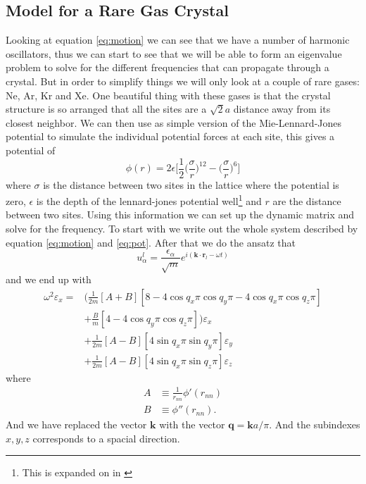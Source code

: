 \documentclass[11pt]{article}
\begin{document}
\subsection{Model for a Rare Gas Crystal}
Looking at equation \ref{eq:motion} we can see that we have a number of harmonic oscillators, thus we can start to see that we will be able to form an eigenvalue problem to solve for the different frequencies that can propagate through a crystal. But in order to simplify things we will only look at a couple of rare gases: Ne, Ar, Kr and Xe. One beautiful thing with these gases is that the crystal structure is so arranged that all the sites are a $\sqrt{2}a$ distance away from its closest neighbor. We can then use as simple version of the Mie-Lennard-Jones potential to simulate the individual potential forces at each site, this gives a potential of
\begin{equation}
	\phi(r) = 2 \epsilon \big[\frac{1}{2} \big(\frac{\sigma}{r}\big)^{12} - \big(\frac{\sigma}{r}\big)^6\big]
	\label{eq:pot}
\end{equation}
where $\sigma$ is the distance between two sites in the lattice where the potential is zero, $\epsilon$ is the depth of the lennard-jones potential well\footnote{This is expanded on in \cite{bib:wiki:mlj}} and $r$ are the distance between two sites. Using this information we can set up the dynamic matrix and solve for the frequency. To start with we write out the whole system described by equation \ref{eq:motion} and \ref{eq:pot}. After that we do the ansatz that 
\begin{equation}
	u^l_{\alpha} = \frac{\epsilon_{\alpha}}{\sqrt{m}}e^{i(\mathbf{k}\cdot\mathbf{r}_l-\omega t)}
\end{equation}
and we end up with 
\begin{align}
	\omega^2\varepsilon_x = &\big( \frac{1}{2m} [A+B][8-4\cos{q_x\pi}\cos{q_y\pi}-4\cos{q_x\pi}\cos{q_z\pi}] \\
	&+ \frac{B}{m}[4-4\cos{q_y\pi}\cos{q_z\pi}]\big)\varepsilon_x \\
	&+\frac{1}{2m}[A-B][4\sin{q_x\pi}\sin{q_y\pi}]\varepsilon_y \\
	&+\frac{1}{2m}[A-B][4\sin{q_x\pi}\sin{q_z\pi}]\varepsilon_z
	\label{eq:omega}
\end{align}
where
\begin{align}
	A &\equiv \frac{1}{r_{nn}} \phi'(r_{nn}) \\
	B &\equiv \phi''(r_{nn}).
	\label{eq:AB}
\end{align}
And we have replaced the vector $\mathbf{k}$ with the vector $\mathbf{q} = \mathbf{k}a/\pi$. And the subindexes $x,y,z$ corresponds to a spacial direction.
\end{document}
